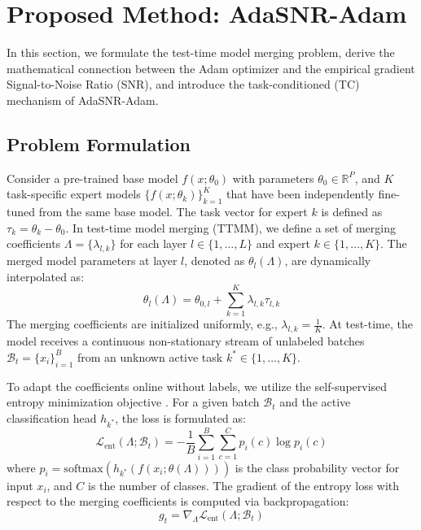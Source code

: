 \documentclass{article}
\theoremstyle{plain}
\theoremstyle{definition}
\theoremstyle{remark}
\begin{document}
\section{Proposed Method: AdaSNR-Adam}
\label{sec:method}
In this section, we formulate the test-time model merging problem, derive the mathematical connection between the Adam optimizer and the empirical gradient Signal-to-Noise Ratio (SNR), and introduce the task-conditioned (TC) mechanism of AdaSNR-Adam.

\subsection{Problem Formulation}
Consider a pre-trained base model $f(x; \theta_0)$ with parameters $\theta_0 \in \mathbb{R}^P$, and $K$ task-specific expert models $\{f(x; \theta_k)\}_{k=1}^K$ that have been independently fine-tuned from the same base model. The task vector for expert $k$ is defined as $\tau_k = \theta_k - \theta_0$.
In test-time model merging (TTMM), we define a set of merging coefficients $\Lambda = \{\lambda_{l, k}\}$ for each layer $l \in \{1, \dots, L\}$ and expert $k \in \{1, \dots, K\}$. The merged model parameters at layer $l$, denoted as $\theta_{l}(\Lambda)$, are dynamically interpolated as:
\begin{equation}
    \theta_{l}(\Lambda) = \theta_{0, l} + \sum_{k=1}^K \lambda_{l, k} \tau_{l, k}
\end{equation}
The merging coefficients are initialized uniformly, e.g., $\lambda_{l, k} = \frac{1}{K}$. At test-time, the model receives a continuous non-stationary stream of unlabeled batches $\mathcal{B}_t = \{x_i\}_{i=1}^B$ from an unknown active task $k^* \in \{1, \dots, K\}$.

To adapt the coefficients online without labels, we utilize the self-supervised entropy minimization objective \cite{wang21tent}. For a given batch $\mathcal{B}_t$ and the active classification head $h_{k^*}$, the loss is formulated as:
\begin{equation}
    \mathcal{L}_{\text{ent}}(\Lambda; \mathcal{B}_t) = - \frac{1}{B} \sum_{i=1}^B \sum_{c=1}^C p_i(c) \log p_i(c)
\end{equation}
where $p_i = \text{softmax}(h_{k^*}(f(x_i; \theta(\Lambda))))$ is the class probability vector for input $x_i$, and $C$ is the number of classes. The gradient of the entropy loss with respect to the merging coefficients is computed via backpropagation:
\begin{equation}
    g_t = \nabla_{\Lambda} \mathcal{L}_{\text{ent}}(\Lambda; \mathcal{B}_t)
\end{equation}
\end{document}
